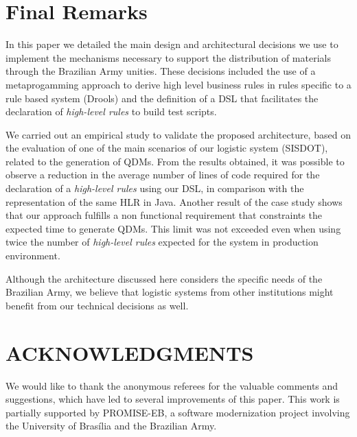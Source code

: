 \documentclass{bmcart}
\newcommand{\callers}{\emph{high-level rules}\xspace}
\newcommand{\shc}{HLR\xspace}
\begin{document}
\section*{Final Remarks}
\label{sec:conclusao}

In this paper we detailed the main design and architectural decisions we use to implement the mechanisms necessary to support the distribution of materials through the Brazilian Army unities. These decisions included the use of a metaprogamming approach to derive high level business rules in rules specific to a rule based system (Drools) and the definition of a DSL that facilitates the declaration of \callers to build test scripts. 

We carried out an empirical study to validate the proposed architecture, based on the evaluation of one of the main scenarios of our logistic system (SISDOT), related to the generation of QDMs. From the results obtained, it was possible to observe a reduction in the average number of lines of code required for the declaration of a \callers using our DSL, in comparison with the representation of the same \shc in Java. Another result of the case study shows that our approach fulfills a non functional requirement that constraints the expected time to generate QDMs. This limit was not exceeded even when using twice the number of \callers expected for the system in production environment.

Although the architecture discussed here considers the specific needs of the Brazilian Army, we believe that logistic systems from other institutions might benefit from our technical decisions as well.







\section*{ACKNOWLEDGMENTS}

We would like to thank the anonymous referees for the valuable comments and suggestions, which have led to several improvements of this paper. This work is partially supported by \textsc{PROMISE-EB}, a software modernization project involving the University of Bras\'{i}lia and the Brazilian Army.
\end{document}
